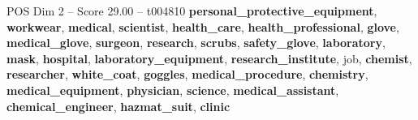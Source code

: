 \begin{textsample}{POS Dim 2 – Score 29.00 – t004810}  \label{ex:f2_pos_019}
\textbf{personal\_protective\_equipment}, \textbf{workwear}, \textbf{medical}, \textbf{scientist}, \textbf{health\_care}, \textbf{health\_professional}, \textbf{glove}, \textbf{medical\_glove}, \textbf{surgeon}, \textbf{research}, \textbf{scrubs}, \textbf{safety\_glove}, \textbf{laboratory}, \textbf{mask}, \textbf{hospital}, \textbf{laboratory\_equipment}, \textbf{research\_institute}, job, \textbf{chemist}, \textbf{researcher}, \textbf{white\_coat}, \textbf{goggles}, \textbf{medical\_procedure}, \textbf{chemistry}, \textbf{medical\_equipment}, \textbf{physician}, \textbf{science}, \textbf{medical\_assistant}, \textbf{chemical\_engineer}, \textbf{hazmat\_suit}, \textbf{clinic}

\end{textsample}
